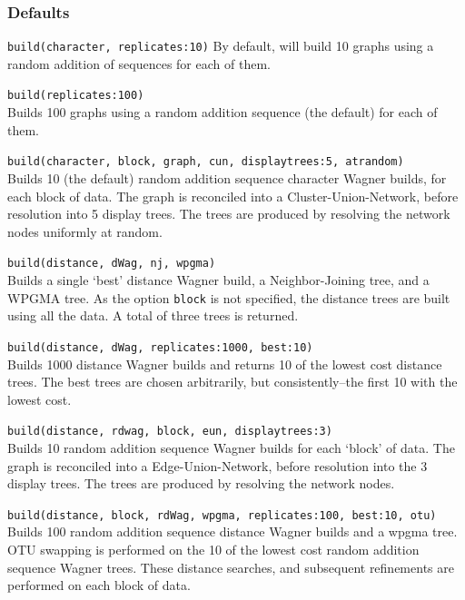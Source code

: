 	\subsubsection{Defaults}
		\texttt{build(character, replicates:10)} By default, \phyg will build 10 graphs using 
		a random addition of sequences for each of them.
		
	\begin{example}
	
		\item{\texttt{build(replicates:100)} \\
		Builds 100 graphs using a random addition sequence (the default) for each of them.}
		
		\item{\texttt{build(character, block, graph, cun, displaytrees:5, atrandom)}\\
		Builds 10 (the default) random addition sequence character Wagner builds, for each 
		block of data. The graph is reconciled into a Cluster-Union-Network, before resolution 
		into 5 display trees. The trees are produced by resolving the network nodes 
		uniformly at random.}
		
		\item{\texttt{build(distance, dWag, nj, wpgma)} \\ 
		Builds a single `best' distance Wagner build, a Neighbor-Joining tree, and a 
		WPGMA tree. As the option \texttt{block} is not specified, the distance trees 
		are built using all the data. A total of three trees is returned.}
		
		\item{\texttt{build(distance, dWag, replicates:1000, best:10)}\\
		Builds 1000 distance Wagner builds and returns 10 of the lowest cost distance trees.
		The best trees are chosen arbitrarily, but consistently--the first 10 with the lowest cost.}
	
		\item{\texttt{build(distance, rdwag, block, eun, displaytrees:3)}\\
		Builds 10 random addition sequence Wagner builds for each `block' of data. The graph 
		is reconciled into a Edge-Union-Network, before resolution into the 3 display trees. 
		The trees are produced by resolving the network nodes.}
		
		\item{\texttt{build(distance, block, rdWag, wpgma, replicates:100, best:10, otu)}\\
		Builds 100 random addition sequence distance Wagner builds and a wpgma tree. 
		OTU swapping is performed on the 10 of the lowest cost random addition 
		sequence Wagner trees. These distance searches, and subsequent refinements are 
		performed on each block of data.}
		
	\end{example}

